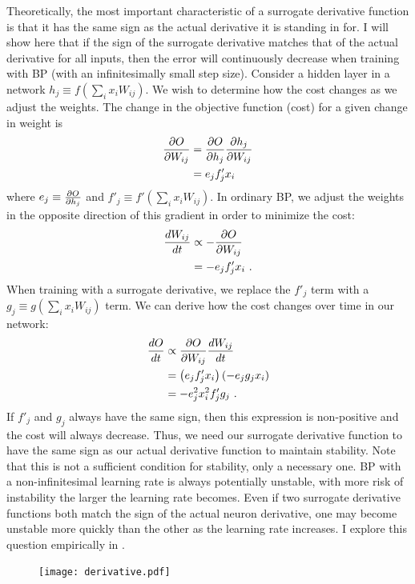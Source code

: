 Theoretically, the most important characteristic
of a surrogate derivative function
is that it has the same sign as the actual derivative it is standing in for.
I will show here that if the sign of the surrogate derivative
matches that of the actual derivative for all inputs,
then the error will continuously decrease
when training with BP (with an infinitesimally small step size).
Consider a hidden layer in a network $h_j \equiv f\left(\sum_i x_i W_{ij}\right)$.
We wish to determine how the cost changes as we adjust the weights.
The change in the objective function (cost) for a given change in weight is
\begin{align}
  \frac{\partial O}{\partial W_{ij}} &= \frac{\partial O}{\partial h_j} \frac{\partial h_j}{\partial W_{ij}} \\
    &= e_j f'_j x_i
\end{align}
where $e_j \equiv \frac{\partial O}{\partial h_j}$ and $f'_j \equiv f'\left(\sum_i x_i W_{ij}\right)$.
In ordinary BP, we adjust the weights in the opposite direction
of this gradient in order to minimize the cost:
\begin{align}
  \frac{dW_{ij}}{dt} &\propto -\frac{\partial O}{\partial W_{ij}} \\
    &= -e_j f'_j x_i \text{ .}
\end{align}
When training with a surrogate derivative,
we replace the $f'_j$ term with a $g_j \equiv g(\sum_i x_i W_{ij})$ term.
We can derive how the cost changes over time in our network:
\begin{align}
  \frac{dO}{dt} &\propto \frac{\partial O}{\partial W_{ij}} \frac{dW_{ij}}{dt} \\
    &= \left(e_j f'_j x_i\right) \left(-e_j g_j x_i\right) \\
    &= -e_j^2 x_i^2 f'_j g_j \text{ .}
\end{align}
If $f'_j$ and $g_j$ always have the same sign,
then this expression is non-positive
and the cost will always decrease.
Thus, we need our surrogate derivative function
to have the same sign as our actual derivative function to maintain stability.
Note that this is not a sufficient condition for stability,
only a necessary one.
BP with a non-infinitesimal learning rate is always potentially unstable,
with more risk of instability the larger the learning rate becomes.
Even if two surrogate derivative functions both match the sign
of the actual neuron derivative,
one may become unstable more quickly than the other
as the learning rate increases.
I explore this question empirically in .


\begin{figure}
  \centering
  \texttt{[image: derivative.pdf]} \\
\end{figure}


